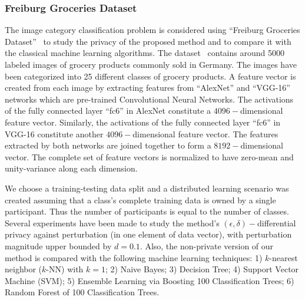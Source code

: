\subsubsection{Freiburg Groceries Dataset}
The image category classification problem is considered using ``Freiburg Groceries Dataset''~\cite{DBLP:journals/corr/JundAEB16} to study the privacy of the proposed method and to compare it with the classical machine learning algorithms. The dataset~\cite{DBLP:journals/corr/JundAEB16} contains around 5000 labeled images of grocery products commonly sold in Germany. The images have been categorized into 25 different classes of grocery products. A feature vector is created from each image by extracting features from ``AlexNet'' and ``VGG-16'' networks which are pre-trained Convolutional Neural Networks. The activations of the fully connected layer ``fc6'' in AlexNet constitute a $4096-$dimensional feature vector. Similarly, the activations of the fully connected layer ``fc6'' in VGG-16 constitute another $4096-$dimensional feature vector. The features extracted by both networks are joined together to form a $8192-$dimensional vector. The complete set of feature vectors is normalized to have zero-mean and unity-variance along each dimension.  

We choose a training-testing data split and a distributed learning scenario was created assuming that a class's complete training data is owned by a single participant. Thus the number of participants is equal to the number of classes. Several experiments have been made to study the method's $(\epsilon,\delta)-$differential privacy against perturbation (in one element of data vector), with perturbation magnitude upper bounded by $d = 0.1$. Also, the non-private version of our method is compared with the following machine learning techniques: 1) $k$-nearest neighbor ($k$-NN) with $k = 1$; 2) Naive Bayes; 3) Decision Tree; 4) Support Vector Machine (SVM); 5) Ensemble Learning via Boosting 100 Classification Trees; 6) Random Forest of 100 Classification Trees. 

